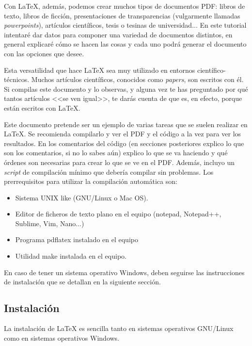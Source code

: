 \documentclass[a4paper]{article}
\begin{document}
Con \LaTeX{}, además, podemos crear muchos tipos de documentos PDF: libros de
texto, libros de ficción, presentaciones de transparencias (vulgarmente
llamadas \textit{powerpoints}), artículos científicos, tesis o tesinas de
universidad... En este tutorial intentaré dar datos para componer una variedad
de documentos distintos, en general explicaré cómo se hacen las cosas y cada
uno podrá generar el documento con las opciones que desee.

Esta versatilidad que hace \LaTeX{} sea muy utilizado en entornos
científico-técnicos. Muchos artículos científicos, conocidos como
\textit{papers}, son escritos con él. Si compilas este documento y lo 
observas, y alguna vez te has preguntado por qué tantos artículos <<se ven
igual>>, te darás cuenta de que es, en efecto, porque están escritos con
\LaTeX{}.

Este documento pretende ser un ejemplo de varias tareas que se suelen realizar
en \LaTeX{}. Se recomienda compilarlo y ver el PDF y el código a la
vez para ver los resultados. En los comentarios del código (en secciones 
posteriores explico lo que son los comentarios, si no lo sabes aún) explico lo 
que se va haciendo y qué órdenes son necesarias para crear lo que se ve en el
PDF. Además, incluyo un \textit{script} de compilación mínimo que debería
compilar sin problemas. Los prerrequisitos para utilizar la compilación
automática son:

\begin{itemize}
    \item Sistema UNIX like (GNU/Linux o Mac OS).
    \item Editor de ficheros de texto plano en el equipo (notepad, Notepad++,
        Sublime, Vim, Nano...)
    \item Programa pdflatex instalado en el equipo
    \item Utilidad make instalada en el equipo.
\end{itemize}

En caso de tener un sistema operativo Windows, deben seguirse las instrucciones
de instalación que se detallan en la siguiente sección.
\subsection{Instalación}
La instalación de \LaTeX{} es sencilla tanto en sistemas operativos GNU/Linux
como en sistemas operativos Windows.
\end{document}
